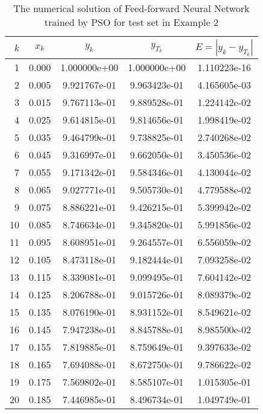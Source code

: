 \begin{table}[ht]
  \caption{The numerical solution of Feed-forward Neural Network trained by PSO for test set in Example 2}
  \centering
  \begin{tabular}{rcccc}
    $k$ & $x_{k}$ & $y_{k}$ & $y_{T_{k}}$ & $E=|y_{k} - y_{T_{k}}|$\\
    \hline\hline
     1 &  0.000 &    1.000000e+00 &    1.000000e+00  &     1.110223e-16\\ 
     2 &  0.005 &    9.921767e-01 &    9.963423e-01  &     4.165605e-03\\ 
     3 &  0.015 &    9.767113e-01 &    9.889528e-01  &     1.224142e-02\\ 
     4 &  0.025 &    9.614815e-01 &    9.814656e-01  &     1.998419e-02\\ 
     5 &  0.035 &    9.464799e-01 &    9.738825e-01  &     2.740268e-02\\ 
     6 &  0.045 &    9.316997e-01 &    9.662050e-01  &     3.450536e-02\\ 
     7 &  0.055 &    9.171342e-01 &    9.584346e-01  &     4.130044e-02\\ 
     8 &  0.065 &    9.027771e-01 &    9.505730e-01  &     4.779588e-02\\ 
     9 &  0.075 &    8.886221e-01 &    9.426215e-01  &     5.399942e-02\\ 
    10 &  0.085 &    8.746634e-01 &    9.345820e-01  &     5.991856e-02\\ 
    11 &  0.095 &    8.608951e-01 &    9.264557e-01  &     6.556059e-02\\ 
    12 &  0.105 &    8.473118e-01 &    9.182444e-01  &     7.093258e-02\\ 
    13 &  0.115 &    8.339081e-01 &    9.099495e-01  &     7.604142e-02\\ 
    14 &  0.125 &    8.206788e-01 &    9.015726e-01  &     8.089379e-02\\ 
    15 &  0.135 &    8.076190e-01 &    8.931152e-01  &     8.549621e-02\\ 
    16 &  0.145 &    7.947238e-01 &    8.845788e-01  &     8.985500e-02\\ 
    17 &  0.155 &    7.819885e-01 &    8.759649e-01  &     9.397633e-02\\ 
    18 &  0.165 &    7.694088e-01 &    8.672750e-01  &     9.786622e-02\\ 
    19 &  0.175 &    7.569802e-01 &    8.585107e-01  &     1.015305e-01\\ 
    20 &  0.185 &    7.446985e-01 &    8.496734e-01  &     1.049749e-01\\ 

\end{tabular}
\end{table}
